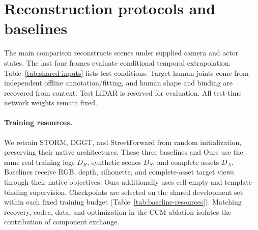 \section{Reconstruction protocols and baselines}
\label{sec:supp-protocol}

The main comparison reconstructs scenes under supplied camera and actor states. The last four frames evaluate conditional temporal extrapolation. Table~\ref{tab:shared-inputs} lists test conditions. Target human joints come from independent offline annotation/fitting, and human shape and binding are recovered from context. Test LiDAR is reserved for evaluation. All test-time network weights remain fixed.

\paragraph{Training resources.}
We retrain STORM, DGGT, and StreetForward from random initialization, preserving their native architectures. These three baselines and Ours use the same real training logs $D_R$, synthetic scenes $D_S$, and complete assets $D_A$. Baselines receive RGB, depth, silhouette, and complete-asset target views through their native objectives. Ours additionally uses cell-empty and template-binding supervision. Checkpoints are selected on the shared development set within each fixed training budget (Table~\ref{tab:baseline-resources}). Matching recovery, codec, data, and optimization in the CCM ablation isolates the contribution of component exchange.

